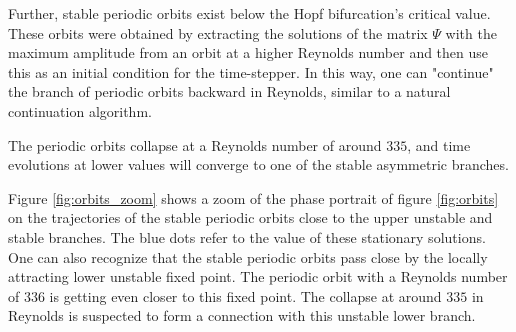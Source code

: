 Further, stable periodic orbits exist below the Hopf bifurcation's critical
value. These orbits were obtained by extracting the solutions of the matrix
$\Psi$ with the maximum amplitude from an orbit at a higher Reynolds number and
then use this as an initial condition for the time-stepper. In this way, one
can "continue" the branch of periodic orbits backward in Reynolds, similar to a
natural continuation algorithm.

The periodic orbits collapse at a Reynolds number of around $335$, and time
evolutions at lower values will converge to one of the stable asymmetric
branches. 

Figure \ref{fig:orbits_zoom} shows a zoom of the phase portrait of figure
\ref{fig:orbits} on the trajectories of the stable periodic orbits close to
the upper unstable and stable branches. The blue dots refer to the value of
these stationary solutions. One can also recognize that the stable periodic
orbits pass close by the locally attracting lower unstable fixed point. The
periodic orbit with a Reynolds number of $336$ is getting even closer to this
fixed point. The collapse at around $335$ in Reynolds is suspected to form a
connection with this unstable lower branch. \\\\

